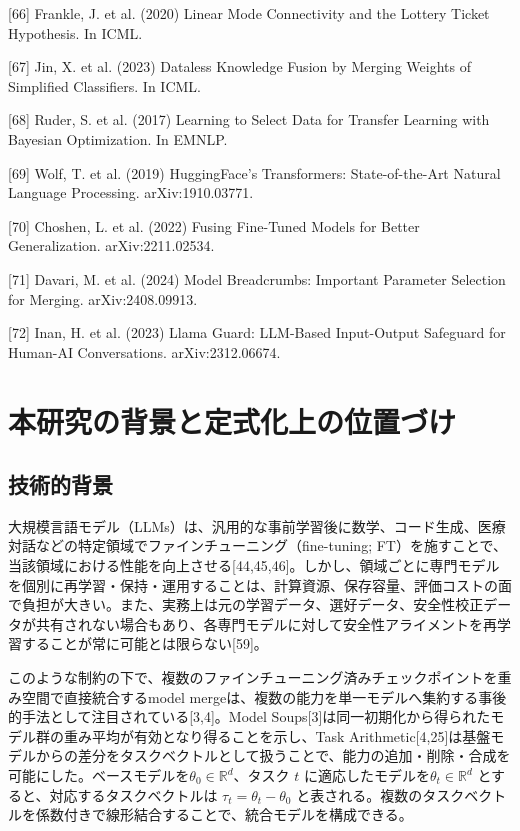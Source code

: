 \documentclass{article}
\begin{document}
{[66] Frankle, J. et al. (2020) Linear Mode Connectivity and the Lottery Ticket Hypothesis. In ICML.

[67] Jin, X. et al. (2023) Dataless Knowledge Fusion by Merging Weights of Simplified Classifiers. In ICML.

[68] Ruder, S. et al. (2017) Learning to Select Data for Transfer Learning with Bayesian Optimization. In EMNLP.

[69] Wolf, T. et al. (2019) HuggingFace's Transformers: State-of-the-Art Natural Language Processing. arXiv:1910.03771.

[70] Choshen, L. et al. (2022) Fusing Fine-Tuned Models for Better Generalization. arXiv:2211.02534.

[71] Davari, M. et al. (2024) Model Breadcrumbs: Important Parameter Selection for Merging. arXiv:2408.09913.

[72] Inan, H. et al. (2023) Llama Guard: LLM-Based Input-Output Safeguard for Human-AI Conversations. arXiv:2312.06674.
}


\newpage
\appendix

\section{本研究の背景と定式化上の位置づけ}
\label{app:本研究の背景と定式化上の位置づけ}

\subsection{技術的背景}
大規模言語モデル（LLMs）は、汎用的な事前学習後に数学、コード生成、医療対話などの特定領域でファインチューニング（fine-tuning; FT）を施すことで、当該領域における性能を向上させる[44,45,46]。しかし、領域ごとに専門モデルを個別に再学習・保持・運用することは、計算資源、保存容量、評価コストの面で負担が大きい。また、実務上は元の学習データ、選好データ、安全性校正データが共有されない場合もあり、各専門モデルに対して安全性アライメントを再学習することが常に可能とは限らない[59]。

このような制約の下で、複数のファインチューニング済みチェックポイントを重み空間で直接統合するmodel mergeは、複数の能力を単一モデルへ集約する事後的手法として注目されている[3,4]。Model Soups[3]は同一初期化から得られたモデル群の重み平均が有効となり得ることを示し、Task Arithmetic[4,25]は基盤モデルからの差分をタスクベクトルとして扱うことで、能力の追加・削除・合成を可能にした。ベースモデルを\(\theta_0 \in \mathbb{R}^d\)、タスク \(t\) に適応したモデルを\(\theta_t \in \mathbb{R}^d\) とすると、対応するタスクベクトルは \(\tau_t = \theta_t - \theta_0\) と表される。複数のタスクベクトルを係数付きで線形結合することで、統合モデルを構成できる。
\end{document}
